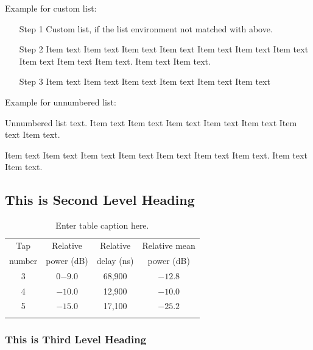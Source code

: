 Example for custom list:
\begin{enumerate}[Step 1]
\item[Step 1] Custom list, if the list environment not matched with above.
\item[Step 2] Item  text  Item text  Item text  Item text  Item text Item text
Item text  Item text Item text Item text. Item text Item text.
\item[Step 3] Item  text  Item text  Item text  Item text  Item text  Item text
\end{enumerate}

Example for unnumbered list:
\begin{description}
\item Unnumbered list text. Item text  Item text  Item text  Item text  Item
text Item text  Item text.
\item Item text  Item text  Item text  Item text  Item text  Item text  Item
text. Item text  Item text.
\end{description}

\subsection{This is Second Level Heading}
\lipsum[3-4]

\begin{table}
\caption{Enter table caption here.\label{tab2-1}}{%
\begin{tabular}{@{}cccc@{}}
\toprule
Tap     &Relative   &Relative   &Relative mean\\
number  &power (dB) &delay (ns) &power (dB)\\
\midrule
3 &0$-9.0$  &68,900\footnotemark[1] &$-12.8$\\
4 &$-10.0$ &12,900\footnotemark[2] &$-10.0$\\
5 &$-15.0$ &17,100 &$-25.2$\\
\botrule
\end{tabular}}{
}
\end{table}

\subsubsection{This is Third Level Heading}

